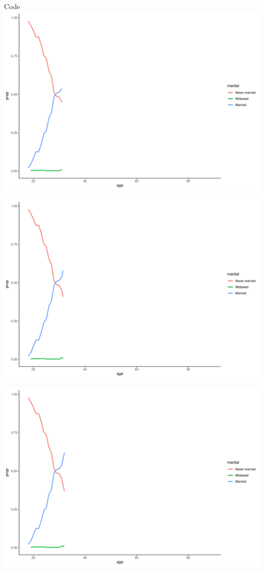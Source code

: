 \documentclass[
  ignorenonframetext,
]{beamer}
\begin{document}
\begin{frame}[fragile]{Code}
\includegraphics{gss_cat_files/figure-beamer/unnamed-chunk-1-23.pdf}

\includegraphics{gss_cat_files/figure-beamer/unnamed-chunk-1-24.pdf}

\includegraphics{gss_cat_files/figure-beamer/unnamed-chunk-1-25.pdf}


\end{frame}
\end{document}

